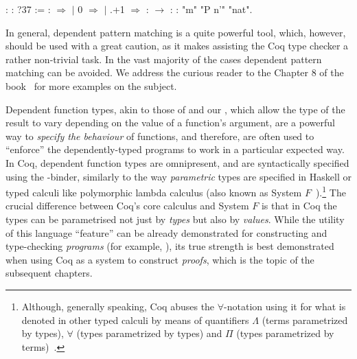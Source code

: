 \coqdocemptyline


\coqdoceol
\coqdocemptyline
\coqdocnoindent
{}:\coqdoceol
\coqdocnoindent
{} \coqdoceol
\coqdocnoindent
{} : ?37\coqdoceol
\coqdocnoindent
{} :=   :  \ensuremath{\Rightarrow}   \coqdoceol
\coqdocindent{10.00em}
\ensuremath{|} 0 \ensuremath{\Rightarrow} \coqdoceol
\coqdocindent{10.00em}
\ensuremath{|} \coqdocvar{\_}.+1 \ensuremath{\Rightarrow} \coqdoceol
\coqdocindent{10.00em}
 :  \ensuremath{\rightarrow} \coqdoceol
\coqdocnoindent
{} : \coqdoceol
\coqdocnoindent
{} :  \coqdoceol
\coqdocnoindent
{}  "m"   "P n'"        "nat".

\coqdocemptyline


In general, dependent pattern matching is a quite powerful tool,
which, however, should be used with a great caution, as it makes
assisting the Coq type checker a rather non-trivial task. In the vast
majority of the cases dependent pattern matching can be avoided. We
address the curious reader to the Chapter 8 of the
book~\cite{Chlipala:BOOK} for more examples on the subject.


 Dependent function types, akin to
those of  and our , which allow the type of the
result to vary depending on the value of a function's argument, are a
powerful way to \textit{specify the behaviour} of functions, and therefore,
are often used to ``enforce'' the dependently-typed programs to work in
a particular expected way. In Coq, dependent function types are
omnipresent, and are syntactically specified using the
\coqdockw{\ensuremath{\forall}}-binder, similarly to the way \textit{parametric} types are specified
in Haskell or typed calculi like polymorphic lambda calculus (also
known as System
$F$~\cite{Reynolds:SP74,Girard:PhD}).\footnote{Although, generally
speaking, Coq abuses the $\forall$-notation using it for what is
denoted in other typed calculi by means of quantifiers $\Lambda$ (terms
parametrized by types), $\forall$ (types parametrized by types) and
$\Pi$ (types parametrized by terms)~\cite{Pierce:BOOK02}.} The
crucial difference between Coq's core calculus and System $F$ is that
in Coq the types can be parametrised not just by \textit{types} but also by
\textit{values}. While the utility of this language ``feature'' can be already
demonstrated for constructing and type-checking \textit{programs} (for
example, ), its true strength is best demonstrated when
using Coq as a system to construct \textit{proofs}, which is the topic of the
subsequent chapters.


